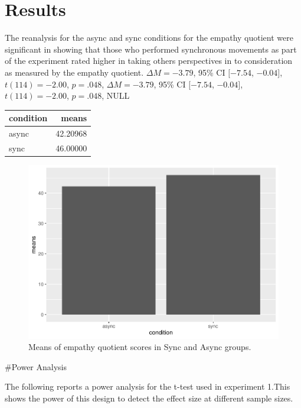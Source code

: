 \documentclass[
  english,
  man,floatsintext]{apa6}
\begin{document}
\hypertarget{results}{%
\section{Results}\label{results}}

The reanalysis for the async and sync conditions for the empathy quotient were significant in showing that those who performed synchronous movements as part of the experiment rated higher in taking others perspectives in to consideration as measured by the empathy quotient. \(\Delta M = -3.79\), 95\% CI \([-7.54\), \(-0.04]\), \(t(114) = -2.00\), \(p = .048\), \(\Delta M = -3.79\), 95\% CI \([-7.54\), \(-0.04]\), \(t(114) = -2.00\), \(p = .048\), NULL

\begin{tabular}{l|r}
\hline
condition & means\\
\hline
async & 42.20968\\
\hline
sync & 46.00000\\
\hline
\end{tabular}

\begin{figure}
\centering
\includegraphics{Manuscript.final_files/figure-latex/unnamed-chunk-3-1.pdf}
\caption{\label{fig:unnamed-chunk-3}Means of empathy quotient scores in Sync and Async groups.}
\end{figure}

\newpage

\#Power Analysis

The following reports a power analysis for the t-test used in experiment 1.This shows the power of this design to detect the effect size at different sample sizes.
\end{document}
